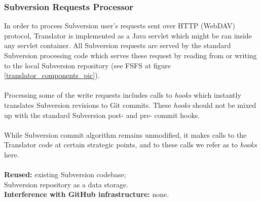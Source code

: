 \subsubsection{Subversion Requests Processor}
In order to process Subversion user's requests sent over HTTP (WebDAV) protocol, Translator is implemented as a Java servlet which might be ran inside any servlet container. All Subversion requests are served by the standard Subversion processing code which serves 
these request by reading from or writing to the local Subversion repository (see FSFS at figure \ref{translator_components_pic}).
\\\\
Processing some of the write requests includes calls to \emph{hooks} which instantly translates Subversion revisions to Git commits.
These \emph{hooks} should not be mixed up with the standard Subversion post- and pre- commit hooks.\\\\
While Subversion commit algorithm remains unmodified, it makes calls to the Translator code at certain strategic points, 
and to these calls we refer as to \emph{hooks} here.
\\\\
\textbf{Reused:} existing Subversion codebase;\\Subversion repository as a data storage.\\
\textbf{Interference with GitHub infrastructure:} none. 

